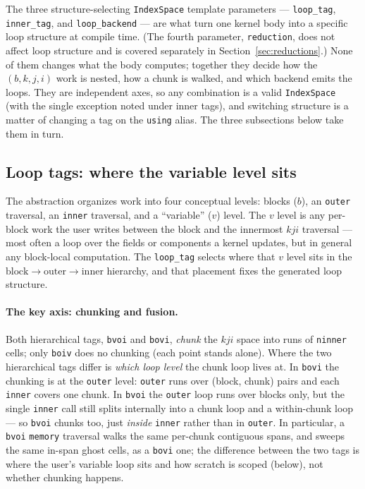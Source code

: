\documentclass[11pt]{article}
\newcommand{\code}[1]{\lstinline[basicstyle=\ttfamily]|#1|}
\begin{document}
The three structure-selecting \code{IndexSpace} template parameters ---
\code{loop_tag}, \code{inner_tag}, and \code{loop_backend} --- are what turn one
kernel body into a specific loop structure at compile time. (The fourth parameter,
\code{reduction}, does not affect loop structure and is covered separately in
Section~\ref{sec:reductions}.) None of them changes what the body computes; together
they decide how the $(b,k,j,i)$ work is nested, how a chunk is walked, and which
backend emits the loops. They are independent axes, so any combination is a valid
\code{IndexSpace} (with the single exception noted under inner tags), and switching
structure is a matter of changing a tag on the \code{using} alias. The three
subsections below take them in turn.

\subsection{Loop tags: where the variable level sits}
\label{sec:looptags}

The abstraction organizes work into four conceptual levels: blocks ($b$), an
\code{outer} traversal, an \code{inner} traversal, and a ``variable'' ($v$) level.
The $v$ level is any per-block work the user writes between the block and the
innermost $kji$ traversal --- most often a loop over the fields or components a
kernel updates, but in general any block-local computation. The \code{loop_tag}
selects where that $v$ level sits in the
$\text{block}\to\text{outer}\to\text{inner}$ hierarchy, and that placement fixes
the generated loop structure.

\paragraph{The key axis: chunking and fusion.} Both hierarchical tags,
\code{bvoi} and \code{bovi}, \emph{chunk} the $kji$ space into runs of
\code{ninner} cells; only \code{boiv} does no chunking (each point stands alone).
Where the two hierarchical tags differ is \emph{which loop level} the chunk loop
lives at. In \code{bovi} the chunking is at the \code{outer} level: \code{outer}
runs over (block, chunk) pairs and each \code{inner} covers one chunk. In
\code{bvoi} the \code{outer} loop runs over blocks only, but the single
\code{inner} call still splits internally into a chunk loop and a within-chunk
loop --- so \code{bvoi} chunks too, just \emph{inside} \code{inner} rather than in
\code{outer}. In particular, a \code{bvoi} \code{memory} traversal walks the same
per-chunk contiguous spans, and sweeps the same in-span ghost cells, as a
\code{bovi} one; the difference between the two tags is where the user's variable
loop sits and how scratch is scoped (below), not whether chunking happens.
\end{document}
